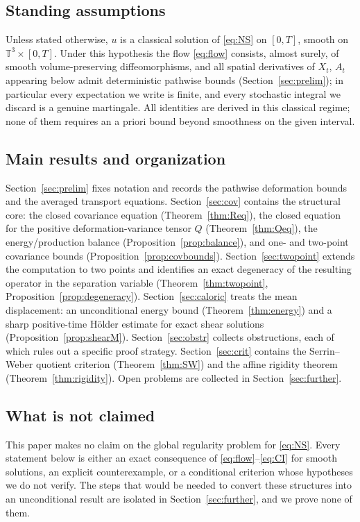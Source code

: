 \documentclass[11pt,reqno]{amsart}
\newcommand{\T}{\mathbb{T}}
\theoremstyle{definition}
\begin{document}
\subsection*{Standing assumptions}
Unless stated otherwise, $u$ is a classical solution of \eqref{eq:NS} on $[0,T]$, smooth on
$\T^3\times[0,T]$. Under this hypothesis the flow \eqref{eq:flow} consists,
almost surely, of smooth volume-preserving diffeomorphisms, and all spatial derivatives of
$X_t$, $A_t$ appearing below admit deterministic pathwise bounds
(Section~\ref{sec:prelim}); in particular every expectation we write is finite, and every
stochastic integral we discard is a genuine martingale. All identities are derived in this
classical regime; none of them requires an a priori bound beyond smoothness on the given
interval.

\subsection*{Main results and organization}
Section~\ref{sec:prelim} fixes notation and records the pathwise deformation bounds and
the averaged transport equations. Section~\ref{sec:cov} contains the structural core: the
closed covariance equation (Theorem~\ref{thm:Req}), the closed equation for the positive
deformation-variance tensor $Q$ (Theorem~\ref{thm:Qeq}), the energy/production balance
(Proposition~\ref{prop:balance}), and one- and two-point covariance bounds
(Proposition~\ref{prop:covbounds}). Section~\ref{sec:twopoint} extends the computation to
two points and identifies an exact degeneracy of the resulting operator in the separation
variable (Theorem~\ref{thm:twopoint}, Proposition~\ref{prop:degeneracy}).
Section~\ref{sec:caloric} treats the mean displacement: an unconditional energy bound
(Theorem~\ref{thm:energy}) and a sharp positive-time H\"older estimate for exact shear
solutions (Proposition~\ref{prop:shearM}). Section~\ref{sec:obstr} collects obstructions,
each of which rules out a specific proof strategy. Section~\ref{sec:crit} contains the
Serrin--Weber quotient criterion (Theorem~\ref{thm:SW}) and the affine rigidity theorem
(Theorem~\ref{thm:rigidity}). Open problems are collected in Section~\ref{sec:further}.

\subsection*{What is not claimed}
This paper makes no claim on the global regularity problem for \eqref{eq:NS}. Every
statement below is either an exact consequence of \eqref{eq:flow}--\eqref{eq:CI} for
smooth solutions, an explicit counterexample, or a conditional criterion whose hypotheses
we do not verify. The steps that would be needed to convert these structures into an
unconditional result are isolated in Section~\ref{sec:further}, and we prove none of them.
\end{document}
